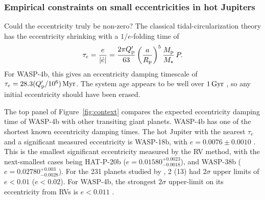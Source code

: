 \documentclass[12pt,twocolumn,tighten]{aastex62}
\begin{document}
\subsubsection{Empirical constraints on small eccentricities in hot
Jupiters}

Could the eccentricity truly be non-zero?  The classical
tidal-circularization theory has the eccentricity shrinking with a
$1/e$-folding time of \citep[{\it e.g.}, Equation~1
of][]{dobbs-dixon_spin-orbit_2004}
\begin{equation}
  \tau_e
  = \frac{e}{|\dot{e}|}
  = \frac{2\pi Q_{\rm p}'}{63}
  \left( \frac{a}{R_{\rm p}} \right)^5
  \frac{M_{\rm p}}{M_\star}\, P .
\end{equation}
For WASP-4b, this gives an eccentricity damping timescale of $\tau_e =
28.3 (Q_{\rm p}'/10^6) \, {\rm Myr}$.  The system age appears to be
well over $1\,{\rm Gyr}$ \citep{winn_transit_2009}, so any initial
eccentricity should have been erased.

The top panel of Figure~\ref{fig:context} compares the expected
eccentricity damping time of WASP-4b with other transiting giant
planets.  WASP-4b has one of the shortest known eccentricity damping
times.  The hot Jupiter with the nearest $\tau_e$ and a significant
measured eccentricity is WASP-18b, with $e = 0.0076 \pm 0.0010$
\citep{triaud_spin-orbit_2010,bonomo_gaps_2017}.  This is the smallest
significant eccentricity measured by the RV method, with the
next-smallest cases being HAT-P-20b ($e =
0.01580^{+0.0023}_{-0.0018}$), and WASP-38b ($e =
0.02780^{+0.003}_{-0.0028}$).  For the 231 planets studied by
\citet{bonomo_gaps_2017}, 2 (13) had $2\sigma$ upper limits of $e <
0.01$ ($e<0.02$).  
For WASP-4b, the strongest $2\sigma$ upper-limit on its eccentricity
from RVs is $e<0.011$
\citep{husnoo_observational_2012,bonomo_gaps_2017}.  
\end{document}
